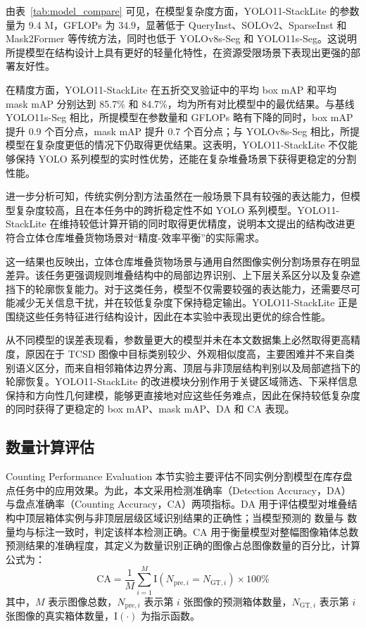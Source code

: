 由表~\ref{tab:model_compare} 可见，在模型复杂度方面，YOLO11-StackLite 的参数量为 9.4 M，GFLOPs 为 34.9，显著低于 QueryInst、SOLOv2、SparseInst 和 Mask2Former 等传统方法，同时也低于 YOLOv8s-Seg 和 YOLO11s-Seg。这说明所提模型在结构设计上具有更好的轻量化特性，在资源受限场景下表现出更强的部署友好性。

在精度方面，YOLO11-StackLite 在五折交叉验证中的平均 box mAP 和平均 mask mAP 分别达到 85.7\% 和 84.7\%，均为所有对比模型中的最优结果。与基线 YOLO11s-Seg 相比，所提模型在参数量和 GFLOPs 略有下降的同时，box mAP 提升 0.9 个百分点，mask mAP 提升 0.7 个百分点；与 YOLOv8s-Seg 相比，所提模型在复杂度更低的情况下仍取得更优结果。这表明，YOLO11-StackLite 不仅能够保持 YOLO 系列模型的实时性优势，还能在复杂堆叠场景下获得更稳定的分割性能。

进一步分析可知，传统实例分割方法虽然在一般场景下具有较强的表达能力，但模型复杂度较高，且在本任务中的跨折稳定性不如 YOLO 系列模型。YOLO11-StackLite 在维持较低计算开销的同时取得更优精度，说明本文提出的结构改进更符合立体仓库堆叠货物场景对“精度-效率平衡”的实际需求。

这一结果也反映出，立体仓库堆叠货物场景与通用自然图像实例分割场景存在明显差异。该任务更强调规则堆叠结构中的局部边界识别、上下层关系区分以及复杂遮挡下的轮廓恢复能力。对于这类任务，模型不仅需要较强的表达能力，还需要尽可能减少无关信息干扰，并在较低复杂度下保持稳定输出。YOLO11-StackLite 正是围绕这些任务特征进行结构设计，因此在本实验中表现出更优的综合性能。

从不同模型的误差表现看，参数量更大的模型并未在本文数据集上必然取得更高精度，原因在于 TCSD 图像中目标类别较少、外观相似度高，主要困难并不来自类别语义区分，而来自相邻箱体边界分离、顶层与非顶层结构判别以及局部遮挡下的轮廓恢复。YOLO11-StackLite 的改进模块分别作用于关键区域筛选、下采样信息保持和方向性几何建模，能够更直接地对应这些任务难点，因此在保持较低复杂度的同时获得了更稳定的 box mAP、mask mAP、DA 和 CA 表现。

\subsection{数量计算评估}{Counting Performance Evaluation}
本节实验主要评估不同实例分割模型在库存盘点任务中的应用效果。为此，本文采用检测准确率（Detection Accuracy，DA）与盘点准确率（Counting Accuracy，CA）两项指标。DA 用于评估模型对堆叠结构中顶层箱体实例与非顶层层级区域识别结果的正确性；当模型预测的  数量与  数量均与标注一致时，判定该样本检测正确。CA 用于衡量模型对整幅图像箱体总数预测结果的准确程度，其定义为数量识别正确的图像占总图像数量的百分比，计算公式为：
\begin{equation}\label{eq:ca}
\mathrm{CA}=\frac{1}{M}\sum_{i=1}^{M}\mathrm{I}\left(N_{\mathrm{pre},i}=N_{\mathrm{GT},i}\right)\times 100\%
\end{equation}
其中，$M$ 表示图像总数，$N_{\mathrm{pre},i}$ 表示第 $i$ 张图像的预测箱体数量，$N_{\mathrm{GT},i}$ 表示第 $i$ 张图像的真实箱体数量，$\mathrm{I}(\cdot)$ 为指示函数。

